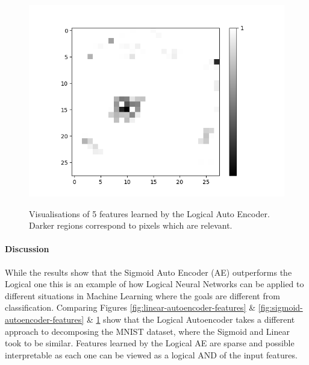 \begin{figure}[H]
\begin{minipage}[b]{0.19\textwidth}
		\includegraphics[width=\textwidth]{LoAE(AND)(20LF)/False/Feature-17.png}
		\label{}
	\end{minipage}
	\caption{Visualisations of 5 features learned by the Logical Auto Encoder. Darker regions correspond to pixels which are relevant.}
	\label{fig:logical-autoencoder-features}
	\hfill
\end{figure}

\paragraph{Discussion}
While the results show that the Sigmoid Auto Encoder (AE) outperforms the Logical one this is an example of how Logical Neural Networks can be applied to different situations in Machine Learning where the goals are different from classification. Comparing Figures \ref{fig:linear-autoencoder-features} \& \ref{fig:sigmoid-autoencoder-features} \& \ref{fig:logical-autoencoder-features} show that the Logical Autoencoder takes a different approach to decomposing the MNIST dataset, where the Sigmoid and Linear took to be similar. Features learned by the Logical AE are sparse and possible interpretable as each one can be viewed as a logical AND of the input features.
